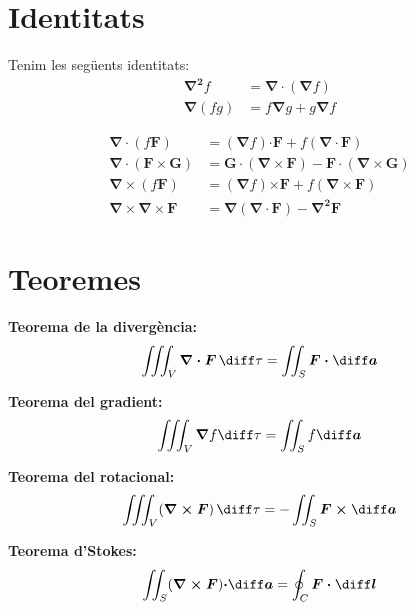 \documentclass[catalan,a4paper,twoside,11pt]{article}
\begin{document}
\section{Identitats }

Tenim les seg\"{u}ents identitats:
\begin{align}
    \boldsymbol{\nabla^2}f &=
    \boldsymbol{\nabla\cdot}(\boldsymbol{\nabla}f)\\[0.5ex]
    \boldsymbol{\nabla}(fg) &=
    f\boldsymbol{\nabla}g+g\boldsymbol{\nabla}f
\end{align}

\begin{align}
    \boldsymbol{\nabla\cdot}(f\boldsymbol{F}) &=
    (\boldsymbol{\nabla}f)\boldsymbol{\cdot F} + f(\boldsymbol{\nabla\cdot F})\\[0.5ex]
    \boldsymbol{\nabla\cdot}(\boldsymbol{F\times G}) &=
    \boldsymbol{G\cdot}(\boldsymbol{\nabla\times F}) -
    \boldsymbol{F\cdot}(\boldsymbol{\nabla\times G})\\[0.5ex]
    \boldsymbol{\nabla\times}(f\boldsymbol{F}) &=
    (\boldsymbol{\nabla}f)\boldsymbol{\times F} + f(\boldsymbol{\nabla\times F})\\[0.5ex]
    \boldsymbol{\nabla\times\nabla\times F} &= \boldsymbol{\nabla}(\boldsymbol{\nabla\cdot F})
    - \boldsymbol{\nabla^2 F}
\end{align}

\section{Teoremes }

\textbf{Teorema de la diverg\`{e}ncia:}
\begin{equation}
    \iiint_V\boldsymbol{\nabla\cdot F}\,\diff \tau = \iint_S\boldsymbol{F\cdot\diff a}
\end{equation}

\textbf{Teorema del gradient:}
\begin{equation}
    \iiint_V\boldsymbol{\nabla}f\diff \tau=\iint_S f\boldsymbol{\diff a}
\end{equation}

\textbf{Teorema del rotacional:}
\begin{equation}
    \iiint_V(\boldsymbol{\nabla\times F})\,\diff \tau=-\iint_S
    \boldsymbol{F\times\diff a}
\end{equation}

\textbf{Teorema d'Stokes:}
\begin{equation}
    \iint_S(\boldsymbol{\nabla\times F})\boldsymbol{\cdot\diff a} =
    \oint_C\boldsymbol{F\cdot\diff l}
\end{equation}
\end{document}

